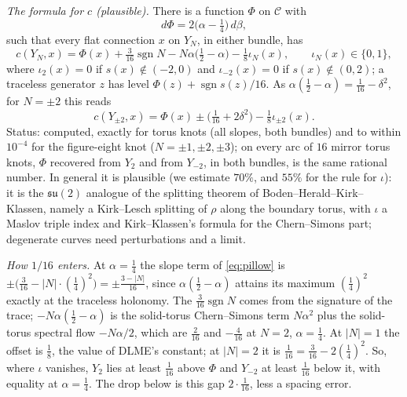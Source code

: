 \documentclass[10pt]{amsart}
\numberwithin{equation}{section}
\theoremstyle{compact}
\theoremstyle{definition}
\newcommand{\cC}{\mathcal C}
\newcommand{\st}[1]{\par\noindent\textit{#1}\enspace}
\begin{document}
\st{The formula for $c$ (plausible).} There is a function $\Phi$ on $\cC$
with
\[
d\Phi=2\bigl(\alpha-\tfrac14\bigr)\,d\beta,
\]
such that every flat connection $x$ on $Y_N$, in either bundle, has
\begin{equation}\label{eq:pillow}
c(Y_N,x)=\Phi(x)+\tfrac3{16}\operatorname{sgn}N-N\alpha\bigl(\tfrac12-\alpha\bigr)-\tfrac18\iota_N(x),\qquad\iota_N(x)\in\{0,1\},
\end{equation}
where $\iota_2(x)=0$ if $s(x)\notin(-2,0)$ and $\iota_{-2}(x)=0$ if
$s(x)\notin(0,2)$; a traceless generator $z$ has level
$\Phi(z)+\operatorname{sgn}s(z)/16$. As
$\alpha(\frac12-\alpha)=\frac1{16}-\delta^2$, for $N=\pm2$ this reads
\begin{equation}\label{eq:pm2}
c(Y_{\pm2},x)=\Phi(x)\pm\bigl(\tfrac1{16}+2\delta^2\bigr)-\tfrac18\iota_{\pm2}(x).
\end{equation}
Status: computed, exactly for torus knots (all slopes, both bundles) and
to within $10^{-4}$ for the figure-eight knot ($N=\pm1,\pm2,\pm3$); on every arc of $16$ mirror
torus knots, $\Phi$ recovered from $Y_2$ and from $Y_{-2}$, in both bundles,
is the same rational number. In general it is plausible (we estimate
$70\%$, and $55\%$ for the rule for $\iota$): it is the $\mathfrak{su}(2)$
analogue of the splitting theorem of Boden--Herald--Kirk--Klassen, namely a
Kirk--Lesch splitting of $\rho$ along the boundary torus, with $\iota$ a
Maslov triple index and Kirk--Klassen's formula for the Chern--Simons part;
degenerate curves need perturbations and a limit.

\st{How $1/16$ enters.} At $\alpha=\frac14$ the slope term of
\eqref{eq:pillow} is $\pm\bigl(\frac3{16}-|N|\cdot(\frac14)^2\bigr)
=\pm\frac{3-|N|}{16}$, since $\alpha(\frac12-\alpha)$ attains its maximum
$(\frac14)^2$ exactly at the traceless holonomy. The $\frac3{16}\operatorname{sgn}N$ comes from
the signature of the trace; $-N\alpha(\frac12-\alpha)$ is the solid-torus
Chern--Simons term $N\alpha^2$ plus the solid-torus spectral flow
$-N\alpha/2$, which are $\frac2{16}$ and $-\frac4{16}$ at $N=2$,
$\alpha=\frac14$. At $|N|=1$ the offset is $\frac18$, the value of DLME's
constant; at $|N|=2$ it is $\frac1{16}=\frac3{16}-2(\frac14)^2$. So, where
$\iota$ vanishes, $Y_2$ lies at least $\frac1{16}$ above $\Phi$ and $Y_{-2}$
at least $\frac1{16}$ below it, with equality at $\alpha=\frac14$. The drop below
is this gap $2\cdot\frac1{16}$, less a spacing error.
\end{document}

